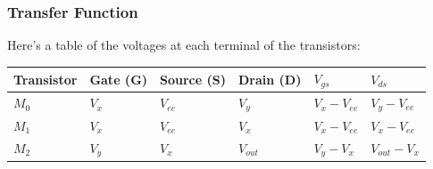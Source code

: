 \subsubsection{Transfer Function}
Here's a table of the voltages at each terminal of the transistors:

\begin{tabularx}{\linewidth}{|X|X|X|X|X|X|} \hline
  Transistor & Gate (G) & Source (S) & Drain (D) & $V_{gs}$ & $V_{ds}$ \\ \hline
  $M_0$ & $V_{x}$ & $V_{ee}$ & $V_{y}$ & $V_{x} - V_{ee}$ & $V_{y} - V_{ee}$ \\ \hline
  $M_1$ & $V_{x}$ & $V_{ee}$ & $V_{x}$ & $V_{x} - V_{ee}$ & $V_{x} - V_{ee}$ \\ \hline
  $M_2$ & $V_{y}$ & $V_{x}$ & $V_{out}$ & $V_{y} - V_{x}$ & $V_{out} - V_{x}$ \\ \hline
\end{tabularx}

